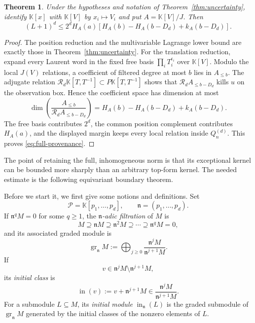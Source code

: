 \documentclass[11pt,reqno]{amsart}
\newcommand\K{\ensuremath{\mathbb{K}}}
\newtheorem{theorem}{Theorem}[section]
\theoremstyle{definition}
\theoremstyle{plain}
\numberwithin{equation}{section}
\begin{document}
\begin{theorem}
\label{thm:full-provenance}
Under the hypotheses and notation of Theorem~\ref{thm:uncertainty}, identify $\K[x]$ with $\K[V]$ by $x_i\mapsto V_i$ and put $A=\K[V]/J$. Then
\begin{equation}\label{eq:full-provenance}
 (L+1)^d\le 2^dH_A(a)
 \left[H_A(b)-H_A(b-D_d)+k_A(b-D_d)\right].
\end{equation}
\end{theorem}

\begin{proof}
The position reduction and the multivariable Lagrange lower bound are exactly
those in Theorem~\ref{thm:uncertainty}.  For the translation reduction,
expand every Laurent word in the fixed free basis
$\prod_iT_i^{\epsilon_i}$ over $\K[V]$.  Modulo the local $J(V)$
relations, a coefficient of filtered degree at most $b$ lies in
$A_{\le b}$.  The adjugate relation
$\mathcal{R}_d \K[T,T^{-1}] \subset P \K[T,T^{-1}]$ shows that
$\mathcal{R}_dA_{\le b-D_d}$ kills $u$ on the observation box.  Hence the
coefficient space has dimension at most
\[
 \dim\left(\frac{A_{\le b}}{\mathcal R_dA_{\le b-D_d}}\right)
 =H_A(b)-H_A(b-D_d)+k_A(b-D_d).
\]
The free basis contributes $2^d$, the common position complement
contributes $H_A(a)$, and the displayed margin keeps every local relation
inside $Q_n^{(d)}$.  This proves \eqref{eq:full-provenance}.
\end{proof}



The point of retaining the full, inhomogeneous norm is that its exceptional
kernel can be bounded more sharply than an arbitrary top-form kernel.  The
needed estimate is the following equivariant boundary theorem. 

Before we start it, we first give some notions and definitions. Set
\begin{equation*}
    \mathscr{P}=\K[p_1,\ldots,p_d],
    \qquad
    \mathfrak{n}=(p_1,\ldots,p_d).
\end{equation*}
If $\mathfrak{n}^qM=0$ for some $q\geq1$, the
\emph{$\mathfrak{n}$-adic filtration} of $M$ is
\begin{equation*}
    M\supseteq\mathfrak{n}M
    \supseteq\mathfrak{n}^2M
    \supseteq\cdots
    \supseteq\mathfrak{n}^qM=0,
\end{equation*}
and its associated graded module is
\begin{equation*}
    \operatorname{gr}_{\mathfrak{n}}M
    :=
    \bigoplus_{j\geq0}
    \frac{\mathfrak{n}^jM}{\mathfrak{n}^{j+1}M}.
\end{equation*}
If
\begin{equation*}
    v\in\mathfrak{n}^jM
    \setminus\mathfrak{n}^{j+1}M,
\end{equation*}
its \emph{initial class} is
\begin{equation*}
    \operatorname{in}(v)
    :=
    v+\mathfrak{n}^{j+1}M
    \in
    \frac{\mathfrak{n}^jM}{\mathfrak{n}^{j+1}M}.
\end{equation*}
For a submodule $L\subseteq M$, its \emph{initial module}
$\operatorname{in}_{\mathfrak{n}}(L)$ is the graded submodule of
$\operatorname{gr}_{\mathfrak{n}}M$ generated by the initial classes
of the nonzero elements of $L$.
\end{document}
